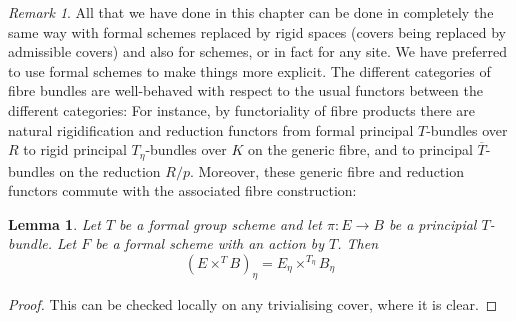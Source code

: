 \documentclass[11pt,oneside]{amsart}
\newtheorem{lemma}[theorem]{Lemma}
\theoremstyle{definition}
\theoremstyle{remark}
\newtheorem{remark}[theorem]{Remark}
\begin{document}
	\begin{remark}\label{appendix in the case of rigid spaces and schemes}
	All that we have done in this chapter can be done in completely the same way with formal schemes replaced by rigid spaces (covers being replaced by admissible covers) and also for schemes, or in fact for any site. We have preferred to use formal schemes to make things more explicit. 
	The different categories of fibre bundles are well-behaved with respect to the usual functors between the different categories: For instance, by functoriality of fibre products there are natural rigidification and reduction functors from formal principal $T$-bundles over $R$ to rigid principal $T_\eta$-bundles over $K$ on the generic fibre, and to principal $\overline{T}$-bundles on the reduction $R/p$. Moreover, these generic fibre and reduction functors commute with the associated fibre construction:
	\end{remark}
	\begin{lemma}\label{associated bundle commutes with generic fibre}
		Let $T$ be a formal group scheme and let $\pi:E\rightarrow B$ be a principial $T$-bundle. Let $F$ be a formal scheme with an action by $T$. Then
		\[(E\times^T B)_\eta = E_\eta\times^{T_\eta} B_\eta \]
	\end{lemma}
	\begin{proof}
		This can be checked locally on any trivialising cover, where it is clear.
	\end{proof}
	
\end{document}
